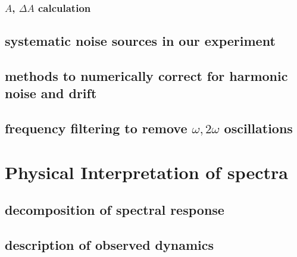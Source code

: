 \subsubsection{$A$, $\Delta A$ calculation}

\subsection{systematic noise sources in our experiment}

\subsection{methods to numerically correct for harmonic noise and drift}

\subsection{frequency filtering to remove $\omega, 2 \omega$ oscillations}

\section{Physical Interpretation of spectra}
\subsection{decomposition of spectral response}
\subsection{description of observed dynamics}